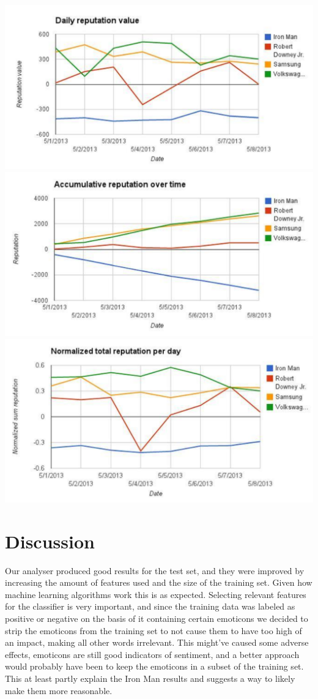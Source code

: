 \documentclass[a4paper]{article}
\begin{document}
\includegraphics[scale=0.6]{graph1.pdf}
\includegraphics[scale=0.6]{graph2.pdf}
\includegraphics[scale=0.6]{graph3.pdf}

\section{Discussion}
Our analyser produced good results for the test set, and they were improved by increasing the amount of features used and the size of the training set. Given how machine learning algorithms work this is as expected. Selecting relevant features for the classifier is very important, and since the training data was labeled as positive or negative on the basis of it containing certain emoticons we decided to strip the emoticons from the training set to not cause them to have too high of an impact, making all other words irrelevant. This might’ve caused some adverse effects, emoticons are still good indicators of sentiment, and a better approach would probably have been to keep the emoticons in a subset of the training set. This at least partly explain the Iron Man results and suggests a way to likely make them more reasonable.
\end{document}
